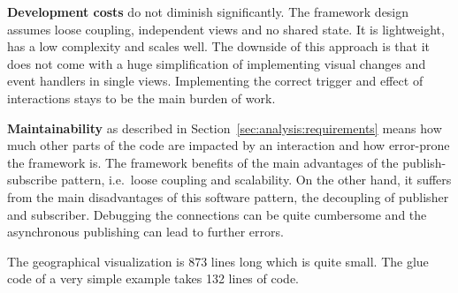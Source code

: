 \textbf{Development costs} do not diminish significantly.
The framework design assumes loose coupling, independent views and no shared state.
It is lightweight, has a low complexity and scales well.
The downside of this approach is that it does not come with a huge simplification of implementing visual changes and event handlers in single views.
Implementing the correct trigger and effect of interactions stays to be the main burden of work.

\textbf{Maintainability} as described in Section~\ref{sec:analysis:requirements} means how much other parts of the code are impacted by an interaction and how error-prone the framework is.
The framework benefits of the main advantages of the publish-subscribe pattern, i.e.\ loose coupling and scalability.
On the other hand, it suffers from the main disadvantages of this software pattern, the decoupling of publisher and subscriber.
Debugging the connections can be quite cumbersome and the asynchronous publishing can lead to further errors.

The geographical visualization is 873 lines long which is quite small.
The glue code of a very simple example takes 132 lines of code.





